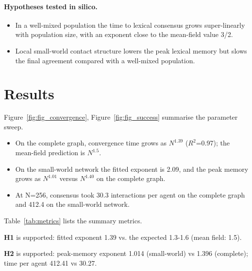 \documentclass[11pt,a4paper]{article}
\begin{document}
\paragraph{Hypotheses tested in silico.}
\begin{itemize}
  \item[\textbf{H1}] In a well-mixed population the time to lexical consensus grows super-linearly with population size, with an exponent close to the mean-field value 3/2.
  \item[\textbf{H2}] Local small-world contact structure lowers the peak lexical memory but slows the final agreement compared with a well-mixed population.
\end{itemize}
\section{Results}
Figure~\ref{fig:fig_convergence}, Figure~\ref{fig:fig_success} summarise the parameter sweep.

\begin{itemize}
  \item On the complete graph, convergence time grows as $N^{1.39}$ ($R^{2}$=0.97); the mean-field prediction is $N^{1.5}$.
  \item On the small-world network the fitted exponent is 2.09, and the peak memory grows as $N^{1.01}$ versus $N^{1.40}$ on the complete graph.
  \item At N=256, consensus took 30.3 interactions per agent on the complete graph and 412.4 on the small-world network.
\end{itemize}

Table~\ref{tab:metrics} lists the summary metrics.

\textbf{H1} is supported: fitted exponent 1.39 vs. the expected 1.3-1.6 (mean field: 1.5).

\textbf{H2} is supported: peak-memory exponent 1.014 (small-world) vs 1.396 (complete); time per agent 412.41 vs 30.27.
\end{document}
